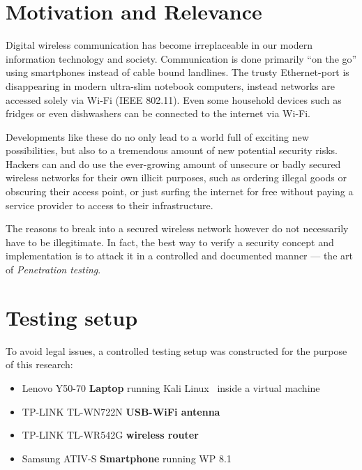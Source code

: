 \section{Motivation and Relevance}

Digital wireless communication has become irreplaceable in our modern information technology and society. Communication is done primarily “on the go” using smartphones instead of cable bound landlines. The trusty Ethernet-port is disappearing in modern ultra-slim notebook computers, instead networks are accessed solely via Wi-Fi (IEEE 802.11). Even some household devices such as fridges or even dishwashers can be connected to the internet via Wi-Fi.

Developments like these do no only lead to a world full of exciting new possibilities, but also to a tremendous amount of new potential security risks. Hackers can and do use the ever-growing amount of unsecure or badly secured wireless networks for their own illicit purposes, such as ordering illegal goods or obscuring their access point, or just surfing the internet for free without paying a service provider to access to their infrastructure.  

The reasons to break into a secured wireless network however do not necessarily have to be illegitimate. In fact, the best way to verify a security concept and implementation is to attack it in a controlled and documented manner --- the art of \emph{Penetration testing}.

\section{Testing setup}

To avoid legal issues, a controlled testing setup was constructed for the purpose of this research:

\begin{itemize}

\item{Lenovo Y50-70 \textbf{Laptop} running Kali Linux~\cite{OffSec17} inside a virtual machine}

\item{TP-LINK TL-WN722N \textbf{USB-WiFi antenna}}

\item{TP-LINK TL-WR542G \textbf{wireless router}}

\item{Samsung ATIV-S \textbf{Smartphone} running WP 8.1}

\end{itemize}

